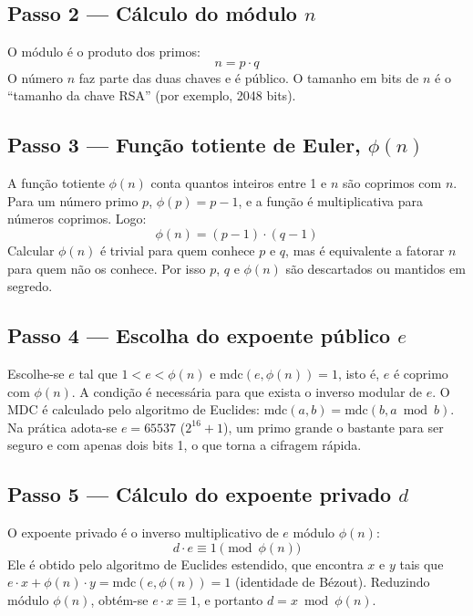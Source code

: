 \documentclass[11pt, a4paper]{article}
\begin{document}
\subsection{Passo 2 --- Cálculo do módulo $n$}
O módulo é o produto dos primos:
\begin{equation}
    n = p \cdot q
\end{equation}
O número $n$ faz parte das duas chaves e é público. O tamanho em bits de $n$ é o ``tamanho da chave RSA'' (por exemplo, 2048 bits).

\subsection{Passo 3 --- Função totiente de Euler, $\phi(n)$}
A função totiente $\phi(n)$ conta quantos inteiros entre 1 e $n$ são coprimos com $n$. Para um número primo $p$, $\phi(p) = p - 1$, e a função é multiplicativa para números coprimos. Logo:
\begin{equation}
    \phi(n) = (p - 1) \cdot (q - 1)
\end{equation}
Calcular $\phi(n)$ é trivial para quem conhece $p$ e $q$, mas é equivalente a fatorar $n$ para quem não os conhece. Por isso $p$, $q$ e $\phi(n)$ são descartados ou mantidos em segredo.

\subsection{Passo 4 --- Escolha do expoente público $e$}
Escolhe-se $e$ tal que $1 < e < \phi(n)$ e $\text{mdc}(e, \phi(n)) = 1$, isto é, $e$ é coprimo com $\phi(n)$. A condição é necessária para que exista o inverso modular de $e$. O MDC é calculado pelo algoritmo de Euclides: $\text{mdc}(a,b) = \text{mdc}(b, a \bmod b)$. Na prática adota-se $e = 65537$ ($2^{16} + 1$), um primo grande o bastante para ser seguro e com apenas dois bits 1, o que torna a cifragem rápida.

\subsection{Passo 5 --- Cálculo do expoente privado $d$}
O expoente privado é o inverso multiplicativo de $e$ módulo $\phi(n)$:
\begin{equation}
    d \cdot e \equiv 1 \pmod{\phi(n)}
\end{equation}
Ele é obtido pelo algoritmo de Euclides estendido, que encontra $x$ e $y$ tais que $e \cdot x + \phi(n) \cdot y = \text{mdc}(e, \phi(n)) = 1$ (identidade de Bézout). Reduzindo módulo $\phi(n)$, obtém-se $e \cdot x \equiv 1$, e portanto $d = x \bmod \phi(n)$.
\end{document}
